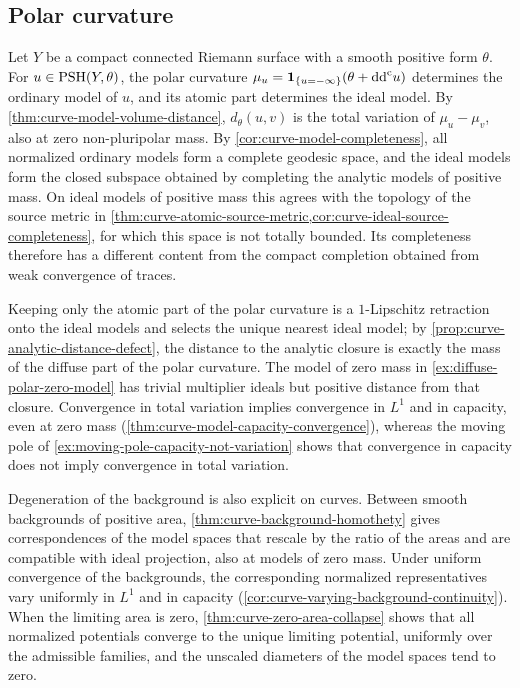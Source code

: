 \subsection{Polar curvature}

Let $Y$ be a compact connected Riemann surface with a smooth positive form $\theta$. For $u\in\mathrm{PSH}(Y,\theta)$, the polar curvature $\mu_u=\mathbf1_{\{u=-\infty\}}(\theta+\mathrm{dd}^{\mathrm{c}} u)$ determines the ordinary model of $u$, and its atomic part determines the ideal model. By \cref{thm:curve-model-volume-distance}, $d_\theta(u,v)$ is the total variation of $\mu_u-\mu_v$, also at zero non-pluripolar mass. By \cref{cor:curve-model-completeness}, all normalized ordinary models form a complete geodesic space, and the ideal models form the closed subspace obtained by completing the analytic models of positive mass. On ideal models of positive mass this agrees with the topology of the source metric in \cref{thm:curve-atomic-source-metric,cor:curve-ideal-source-completeness}, for which this space is not totally bounded. Its completeness therefore has a different content from the compact completion obtained from weak convergence of traces.

Keeping only the atomic part of the polar curvature is a $1$-Lipschitz retraction onto the ideal models and selects the unique nearest ideal model; by \cref{prop:curve-analytic-distance-defect}, the distance to the analytic closure is exactly the mass of the diffuse part of the polar curvature. The model of zero mass in \cref{ex:diffuse-polar-zero-model} has trivial multiplier ideals but positive distance from that closure. Convergence in total variation implies convergence in $L^1$ and in capacity, even at zero mass (\cref{thm:curve-model-capacity-convergence}), whereas the moving pole of \cref{ex:moving-pole-capacity-not-variation} shows that convergence in capacity does not imply convergence in total variation.

Degeneration of the background is also explicit on curves. Between smooth backgrounds of positive area, \cref{thm:curve-background-homothety} gives correspondences of the model spaces that rescale by the ratio of the areas and are compatible with ideal projection, also at models of zero mass. Under uniform convergence of the backgrounds, the corresponding normalized representatives vary uniformly in $L^1$ and in capacity (\cref{cor:curve-varying-background-continuity}). When the limiting area is zero, \cref{thm:curve-zero-area-collapse} shows that all normalized potentials converge to the unique limiting potential, uniformly over the admissible families, and the unscaled diameters of the model spaces tend to zero.

